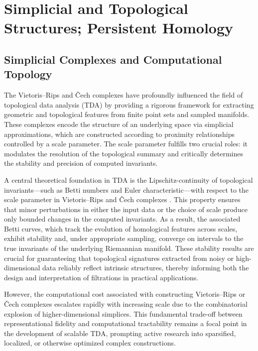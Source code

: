 \documentclass[sigconf]{acmart}
\begin{document}
\section{Simplicial and Topological Structures; Persistent Homology}

\subsection{Simplicial Complexes and Computational Topology}

The Vietoris–Rips and Čech complexes have profoundly influenced the field of topological data analysis (TDA) by providing a rigorous framework for extracting geometric and topological features from finite point sets and sampled manifolds. These complexes encode the structure of an underlying space via simplicial approximations, which are constructed according to proximity relationships controlled by a scale parameter. The scale parameter fulfills two crucial roles: it modulates the resolution of the topological summary and critically determines the stability and precision of computed invariants.

A central theoretical foundation in TDA is the Lipschitz-continuity of topological invariants—such as Betti numbers and Euler characteristic—with respect to the scale parameter in Vietoris–Rips and Čech complexes \cite{ref88}. This property ensures that minor perturbations in either the input data or the choice of scale produce only bounded changes in the computed invariants. As a result, the associated Betti curves, which track the evolution of homological features across scales, exhibit stability and, under appropriate sampling, converge on intervals to the true invariants of the underlying Riemannian manifold. These stability results are crucial for guaranteeing that topological signatures extracted from noisy or high-dimensional data reliably reflect intrinsic structures, thereby informing both the design and interpretation of filtrations in practical applications.

However, the computational cost associated with constructing Vietoris–Rips or Čech complexes escalates rapidly with increasing scale due to the combinatorial explosion of higher-dimensional simplices. This fundamental trade-off between representational fidelity and computational tractability remains a focal point in the development of scalable TDA, prompting active research into sparsified, localized, or otherwise optimized complex constructions.
\end{document}
